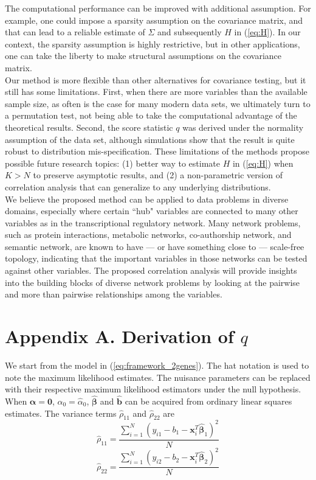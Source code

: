 \documentclass[aap, preprint]{imsart}
\numberwithin{equation}{section}
\theoremstyle{plain}
\begin{document}
The computational performance can be improved with additional assumption. For example, one could impose a sparsity assumption on the covariance matrix, and that can lead to a reliable estimate of $\Sigma$ and subsequently $H$ in (\ref{eq:H}). In our context, the sparsity assumption is highly restrictive, but in other applications, one can take the liberty to make structural assumptions on the covariance matrix.  \\

Our method is more flexible than other alternatives for covariance testing, but it still has some limitations. First, when there are more variables than the available sample size, as often is the case for many modern data sets, we ultimately turn to a permutation test, not being able to take the computational advantage of the theoretical results. Second, the score statistic $q$ was derived under the normality assumption of the data set, although simulations show that the result is quite robust to distribution mis-specification. These limitations of the methods propose possible future research topics: (1) better way to estimate $H$ in (\ref{eq:H}) when $K > N$ to preserve asymptotic results, and (2) a non-parametric version of correlation analysis that can generalize to any underlying distributions. \\

We believe the proposed method can be applied to data problems in diverse domains, especially where certain ``hub" variables are connected to many other variables as in the transcriptional regulatory network. Many network problems, such as protein interactions, metabolic networks, co-authorship network, and semantic network, are known to have --- or have something close to --- scale-free topology, indicating that the important variables in those networks can be tested against other variables. The proposed correlation analysis will provide insights into the building blocks of diverse network problems by looking at the pairwise and more than pairwise relationships among the variables.
 
\pagebreak 



 
\pagebreak
 
\section*{Appendix A. Derivation of $q$}
We start from the model in (\ref{eq:framework_2genes}). The hat notation is used to note the maximum likelihood estimates. The nuisance parameters can be replaced with their respective maximum likelihood estimators under the null hypothesis. When $\bm{\alpha} = \bm{0}$, $\alpha_0 = \hat{\alpha}_0$, $\hat{\bm{\beta}}$ and $\hat{\bm{b}}$ can be acquired from ordinary linear squares estimates. The variance terms $\hat{\rho}_{11}$ and $\hat{\rho}_{22}$ are
$$\hat{\rho}_{11} =  \frac{\sum_{i=1}^{N}(y_{i1} - b_1 - \bm{x}_i^T\bm{\hat{\beta}}_{1})^2}{N}$$
$$\hat{\rho}_{22}=  \frac{\sum_{i=1}^{N}(y_{i2} - b_2 - \bm{x}_i^T\bm{\hat{\beta}}_{2})^2}{N}$$
\end{document}
